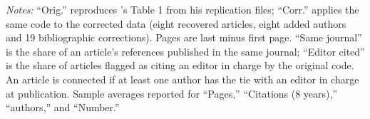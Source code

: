 \begin{table}[!htbp]
\begin{tabular*}{\linewidth}{@{\extracolsep{\fill}}lcccccccccc}
\bottomrule
\end{tabular*}
\begin{minipage}{\linewidth}
\vspace{4pt}
\footnotesize\textit{Notes:} ``Orig.'' reproduces \citeauthor{Colussi2018}'s \citeyearpar[p. 46]{Colussi2018} Table 1 from his replication files; ``Corr.'' applies the same code to the corrected data (eight recovered articles, eight added authors and 19 bibliographic corrections). Pages are last minus first page. ``Same journal'' is the share of an article's references published in the same journal; ``Editor cited'' is the share of articles flagged as citing an editor in charge by the original code. An article is connected if at least one author has the tie with an editor in charge at publication. Sample averages reported for ``Pages,'' ``Citations (8 years),'' ``authors,'' and ``Number.''
\end{minipage}
\end{table}